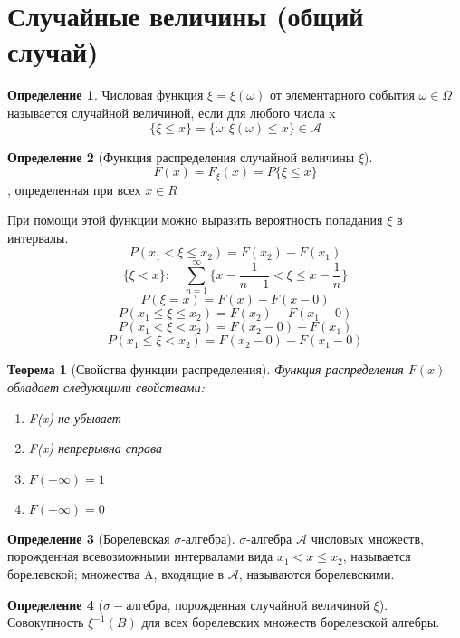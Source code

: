 \documentclass[a4paper]{article}
\newtheorem{theorem}{Теорема}[section]
\theoremstyle{definition}
\newtheorem*{definition}{Определение}
\theoremstyle{remark}
\begin{document}
\section{Случайные величины (общий случай)}
\begin{definition}
    Числовая функция $\xi = \xi (\omega)$ от элементарного события $\omega \in \Omega$ называется случайной величиной, если для любого числа x
    \[\{\xi \leq x\}=\{\omega : \xi(\omega)\leq x\} \in \mathscr{A}\]
\end{definition}
\begin{definition}[Функция распределения случайной величины $\xi$]
    \[F(x) = F_\xi (x) = P \{\xi \le x\}\], определенная при всех $x\in R$
\end{definition}
При помощи этой функции можно выразить вероятность попадания $\xi$ в интервалы.
\[P(x_1 < \xi \le x_2) = F(x_2) - F(x_1)\]
\[\{\xi < x\}: \quad \sum_{n=1}^{\infty} \{x - \frac{1}{n-1}<\xi \le x - \frac{1}{n}\} \]
\[P({\xi = x}) = F(x) - F(x - 0)\]
\[P({x_1 \le \xi \le x_2}) = F(x_2) - F(x_1 - 0)\]
\[P({x_1 < \xi < x_2}) = F(x_2 - 0 )  - F(x_1)\]
\[P (x_1 \le \xi < x_2) = F(x_2 - 0) - F(x_1 - 0)\]
\begin{theorem}[Свойства функции распределения]
    Функция распределения $F(x)$ обладает следующими свойствами:
    \begin{enumerate}
        \item F(x) не убывает
        \item F(x) непрерывна справа
        \item $F(+\infty) = 1$
        \item $F(-\infty) = 0$
    \end{enumerate}
\end{theorem}
\begin{definition}[Борелевская $\sigma$-алгебра]
    $\sigma$-алгебра $\mathcal{A}$ числовых множеств, порожденная всевозможными интервалами вида $x_1<x\leq x_2$, называется борелевской; множества A, входящие в $\mathcal{A}$, называются борелевскими.
\end{definition}
\begin{definition}[$\sigma-$алгебра, порожденная случайной величиной $\xi$]
    Совокупность $\xi^{-1}(B)$ для всех борелевских множеств борелевской алгебры.
\end{definition}
\end{document}
